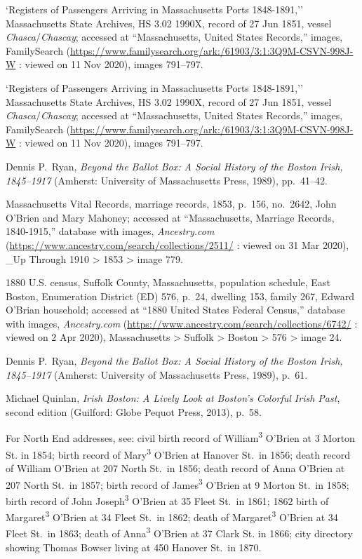 \begin{thebibliography}{999}
`Registers of Passengers Arriving in Massachusetts Ports 1848-1891,'' Massachusetts State Archives, HS 3.02 1990X, record of 27 Jun 1851, vessel \textit{Chasca}/\textit{Chascay}; accessed at ``Massachusetts, United States Records,'' images, FamilySearch (\url{https://www.familysearch.org/ark:/61903/3:1:3Q9M-CSVN-998J-W} : viewed on 11 Nov 2020), images 791--797.

`Registers of Passengers Arriving in Massachusetts Ports 1848-1891,'' Massachusetts State Archives, HS 3.02 1990X, record of 27 Jun 1851, vessel \textit{Chasca}/\textit{Chascay}; accessed at ``Massachusetts, United States Records,'' images, FamilySearch (\url{https://www.familysearch.org/ark:/61903/3:1:3Q9M-CSVN-998J-W} : viewed on 11 Nov 2020), images 791--797.

Dennis P.\ Ryan, \textit{Beyond the Ballot Box: A Social History of the Boston Irish, 1845--1917} (Amherst: University of Massachusetts Press, 1989), pp.\ 41--42.

Massachusetts Vital Records, marriage records, 1853, p.\ 156, no.\ 2642, John O'Brien and Mary Mahoney; accessed at ``Massachusetts, Marriage Records, 1840-1915,'' database with images, \textit{Ancestry.com} (\url{https://www.ancestry.com/search/collections/2511/} : viewed on 31 Mar 2020), \_Up Through 1910 > 1853 > image 779.

1880 U.S. census, Suffolk County, Massachusetts, population schedule, East Boston, Enumeration District (ED) 576, p.\ 24, dwelling 153, family 267, Edward O'Brian household; accessed at ``1880 United States Federal Census,'' database with images, \textit{Ancestry.com} (\url{https://www.ancestry.com/search/collections/6742/} : viewed on 2 Apr 2020), Massachusetts > Suffolk > Boston > 576 > image 24.

Dennis P.\ Ryan, \textit{Beyond the Ballot Box: A Social History of the Boston Irish, 1845--1917} (Amherst: University of Massachusetts Press, 1989), p.\ 61.

Michael Quinlan, \textit{Irish Boston: A Lively Look at Boston's Colorful Irish Past}, second edition (Guilford: Globe Pequot Press, 2013), p.\ 58.

For North End addresses, see: civil birth record of William\textsuperscript{3} O'Brien at 3 Morton St. in 1854; birth record of Mary\textsuperscript{3} O'Brien at Hanover St.\ in 1856; death record of William O'Brien at 207 North St.\ in 1856; death record of Anna O'Brien at 207 North St.\ in 1857; birth record of James\textsuperscript{3} O'Brien at 9 Morton St.\ in 1858; birth record of John Joseph\textsuperscript{3} O'Brien at 35 Fleet St.\ in 1861; 1862 birth of Margaret\textsuperscript{3} O'Brien at 34 Fleet St.\ in 1862; death of Margaret\textsuperscript{3}  O'Brien at 34 Fleet St.\ in 1863; death of Anna\textsuperscript{3} O'Brien at 37 Clark St. in 1866; city directory showing Thomas Bowser living at 450 Hanover St.\ in 1870.


\end{thebibliography}
